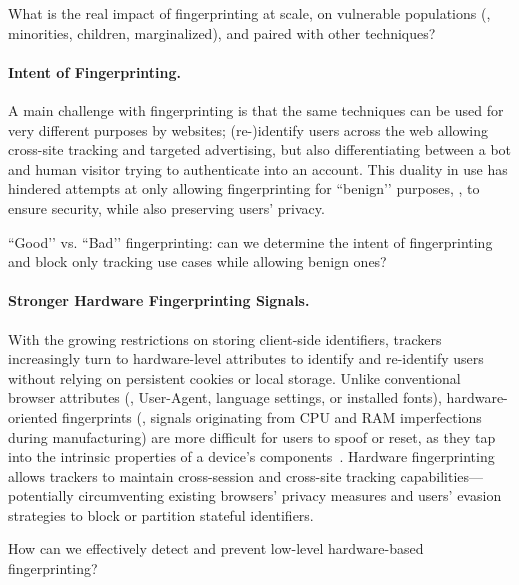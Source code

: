 \begin{opbox}
What is the real impact of fingerprinting at scale, on vulnerable populations (\eg{}, minorities, children, marginalized), and paired with other techniques?
\end{opbox}

\paragraph{Intent of Fingerprinting.}
A main challenge with fingerprinting is that the same techniques can be used for very different purposes by websites; (re-)identify users across the web allowing cross-site tracking and targeted advertising, but also differentiating between a bot and human visitor trying to authenticate into an account. This duality in use has hindered attempts at only allowing fingerprinting for ``benign’’ purposes, \ie{}, to ensure security, while also preserving users' privacy.

\begin{opbox}
``Good’’  vs. ``Bad’’ fingerprinting: can we determine the intent of fingerprinting and block only tracking use cases while allowing benign ones? 
\end{opbox}


\paragraph{Stronger Hardware Fingerprinting Signals.}
With the growing restrictions on storing client-side identifiers, trackers increasingly turn to hardware-level attributes to identify and re-identify users without relying on persistent cookies or local storage.
%
Unlike conventional browser attributes (\eg{}, User-Agent, language settings, or installed fonts), hardware-oriented fingerprints (\eg{}, signals originating from CPU and RAM imperfections during manufacturing) are more difficult for users to spoof or reset, as they tap into the intrinsic properties of a device’s components~\cite{venugopalanFPRowhammerDRAMBasedDevice2024}.
%
Hardware fingerprinting allows trackers to maintain cross-session and cross-site tracking capabilities---potentially circumventing existing browsers' privacy measures and users' evasion strategies to block or partition stateful identifiers.

\begin{opbox}
How can we effectively detect and prevent low-level hardware-based fingerprinting?
\end{opbox}

